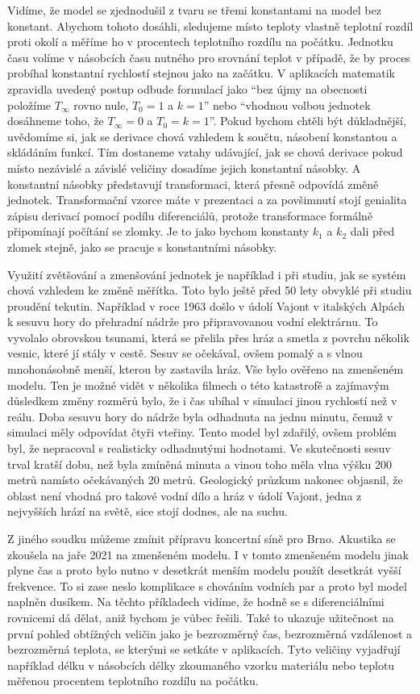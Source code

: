 \documentclass[12pt]{article}
\begin{document}
Vidíme, že model se zjednodušil z tvaru se třemi konstantami na model bez konstant. Abychom tohoto dosáhli, sledujeme místo teploty vlastně teplotní rozdíl proti okolí a měříme ho v procentech teplotního rozdílu na počátku. Jednotku času volíme v násobcích času nutného pro srovnání teplot v případě, že by proces probíhal konstantní rychlostí stejnou jako na začátku. V aplikacích matematik zpravidla uvedený postup odbude formulací jako ``bez újmy na obecnosti položíme $T_\infty$ rovno nule, $T_0=1$ a $k=1$'' nebo ``vhodnou volbou jednotek dosáhneme toho, že $T_\infty=0$ a $T_0=k=1$''. Pokud bychom chtěli být důkladnější, uvědomíme si, jak se derivace chová vzhledem k součtu, násobení konstantou a skládáním funkcí. Tím dostaneme vztahy udávající, jak se chová derivace pokud místo nezávislé a závislé veličiny dosadíme jejich konstantní násobky. A konstantní násobky představují transformaci, která přesně odpovídá změně jednotek. Transformační vzorce máte v prezentaci a za povšimnutí stojí genialita zápisu derivací pomocí podílu diferenciálů, protože transformace formálně připomínají počítání se zlomky. Je to jako bychom konstanty $k_1$ a $k_2$ dali před zlomek stejně, jako se pracuje s konstantními násobky.

Využití zvětšování a zmenšování jednotek je například i při studiu, jak se systém chová vzhledem ke změně měřítka. Toto bylo ještě před 50 lety obvyklé při studiu proudění tekutin. Například v  roce 1963 došlo v údolí Vajont v italských Alpách k sesuvu hory do přehradní nádrže pro připravovanou vodní elektrárnu. To vyvolalo obrovskou tsunami, která se přelila přes hráz a smetla z povrchu několik vesnic, které jí stály v cestě. Sesuv se očekával, ovšem pomalý a s vlnou mnohonásobně menší, kterou by zastavila hráz. Vše bylo ověřeno na zmenšeném modelu. Ten je možné vidět v několika filmech o této katastrofě a zajímavým důsledkem změny rozměrů bylo, že i čas ubíhal v simulaci jinou rychlostí než v reálu. Doba sesuvu hory do nádrže byla odhadnuta na jednu minutu, čemuž v simulaci měly odpovídat čtyři vteřiny. Tento model byl zdařilý, ovšem problém byl, že nepracoval s realisticky odhadnutými hodnotami. Ve skutečnosti sesuv trval kratší dobu, než byla zmíněná minuta a vinou toho měla vlna výšku 200 metrů namísto očekávaných 20 metrů. Geologický průzkum nakonec objasnil, že oblast není vhodná pro takové vodní dílo a hráz v údolí Vajont, jedna z nejvyšších hrází na světě, sice stojí dodnes, ale na suchu.

Z jiného soudku můžeme zmínit přípravu koncertní síně pro Brno. Akustika se zkoušela na jaře 2021 na zmenšeném modelu. I v tomto zmenšeném modelu jinak plyne čas a proto bylo nutno v desetkrát menším modelu použít desetkrát vyšší frekvence. To si zase neslo komplikace s chováním vodních par a proto byl model naplněn dusíkem. Na těchto příkladech vidíme, že hodně se s diferenciálními rovnicemi dá dělat, aniž bychom je vůbec řešili. Také to ukazuje užitečnost na první pohled obtížných veličin jako je bezrozměrný čas, bezrozměrná vzdálenost a bezrozměrná teplota, se kterými se setkáte v aplikacích. Tyto veličiny vyjadřují například délku v násobcích délky zkoumaného vzorku materiálu nebo teplotu měřenou procentem teplotního rozdílu na počátku. 
\end{document}
